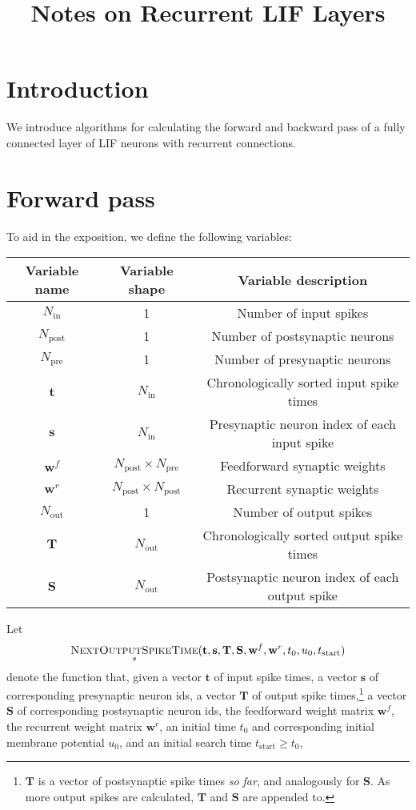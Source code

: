 \documentclass[12pt]{article}
\title{Notes on Recurrent LIF Layers}
\newcommand{\nost}{\textsc{NextOutputSpikeTime}}
\begin{document}
\maketitle

\section*{Introduction}
We introduce algorithms for calculating the forward and backward pass of a fully connected layer of LIF neurons with recurrent connections.

\section{Forward pass}
To aid in the exposition, we define the following variables:
\begin{center}
  \begin{tabular}{c c c}
    Variable name & Variable shape & Variable description \\
    \hline
    $N_{\text{in}}$ & 1 & Number of input spikes \\
    $N_{\text{post}}$ & 1 & Number of postsynaptic neurons \\
    $N_{\text{pre}}$ & 1 & Number of presynaptic neurons \\
    $\mathbf{t}$ & $N_{\text{in}}$ & Chronologically sorted input spike times \\
    $\mathbf{s}$ & $N_{\text{in}}$ & Presynaptic neuron index of each input spike \\
    $\mathbf{w}^f$ & $N_{\text{post}} \times N_{\text{pre}}$ & Feedforward synaptic weights \\
    $\mathbf{w}^r$ & $N_{\text{post}} \times N_{\text{post}}$ & Recurrent synaptic weights \\
    \hline
    $N_{\text{out}}$ & 1 & Number of output spikes \\
    $\mathbf{T}$ & $N_{\text{out}}$ & Chronologically sorted output spike times \\
    $\mathbf{S}$ & $N_{\text{out}}$ & Postsynaptic neuron index of each output spike
  \end{tabular}
\end{center}
Let
\begin{gather*}
  \underset{s}{\nost}(\mathbf{t}, \mathbf{s}, \mathbf{T}, \mathbf{S}, \mathbf{w}^f, \mathbf{w}^r, t_0, u_0, t_{\text{start}})
\end{gather*}
denote the function that, given a vector $\mathbf{t}$ of input spike times, a vector $\mathbf{s}$ of corresponding presynaptic neuron ids, a vector $\mathbf{T}$ of output spike times,\footnote{$\mathbf{T}$ is a vector of postsynaptic spike times \textit{so far}, and analogously for $\mathbf{S}$. As more output spikes are calculated, $\mathbf{T}$ and $\mathbf{S}$ are appended to.} a vector $\mathbf{S}$ of corresponding postsynaptic neuron ids, the feedforward weight matrix $\mathbf{w}^f$, the recurrent weight matrix $\mathbf{w}^r$, an initial time $t_0$ and corresponding initial membrane potential $u_0$, and an initial search time $t_{\text{start}} \geq t_0$,
\end{document}
